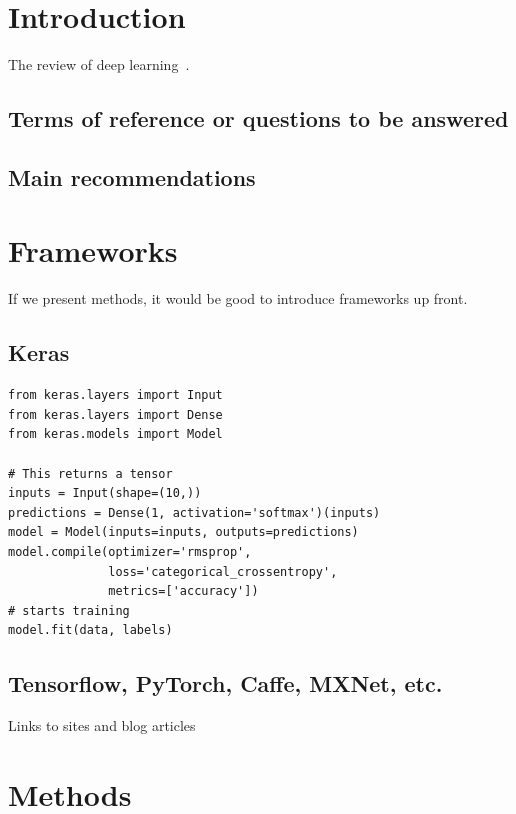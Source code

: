 \documentclass[12pt, a4paper, oneside, headinclude, footinclude]{article}
\begin{document}
\section{Introduction}

The review of deep learning~\cite{lecun2015deep}.

\subsection{Terms of reference or questions to be answered}

\subsection{Main recommendations}



\section{Frameworks}

If we present methods, it would be good to introduce frameworks up front.

\subsection{Keras}


\begin{verbatim}
from keras.layers import Input
from keras.layers import Dense
from keras.models import Model

# This returns a tensor
inputs = Input(shape=(10,))
predictions = Dense(1, activation='softmax')(inputs)
model = Model(inputs=inputs, outputs=predictions)
model.compile(optimizer='rmsprop',
              loss='categorical_crossentropy',
              metrics=['accuracy'])
# starts training
model.fit(data, labels)  
\end{verbatim}



\subsection{Tensorflow, PyTorch, Caffe, MXNet, etc.}

Links to sites and  blog articles

\section{Methods}
\end{document}
